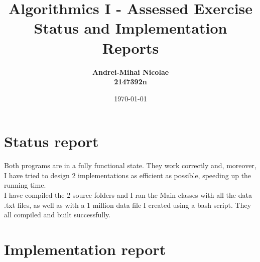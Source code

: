 \documentclass{article}
\title{Algorithmics I - Assessed Exercise\\ \vspace{4mm} 
Status and Implementation Reports}
\author{\bf Andrei-Mihai Nicolae \\ \bf 2147392n}
\date{\today}
\begin{document}
\maketitle

\section*{Status report}

Both programs are in a fully functional state. They work correctly
and, moreover, I have tried to design 2 implementations as efficient
as possible, speeding up the running time. \\
I have compiled the 2 source folders and I ran the Main classes with all the data
.txt files, as well as with a 1 million data file I created using a
bash script. They all compiled and built successfully. 

\section*{Implementation report}
\end{document}
